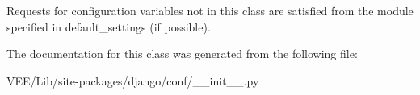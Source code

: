\begin{DoxyVerb}Requests for configuration variables not in this class are satisfied
from the module specified in default_settings (if possible).
\end{DoxyVerb}
 

The documentation for this class was generated from the following file\+:\begin{DoxyCompactItemize}
\item 
V\+E\+E/\+Lib/site-\/packages/django/conf/\+\_\+\+\_\+init\+\_\+\+\_\+.\+py\end{DoxyCompactItemize}

